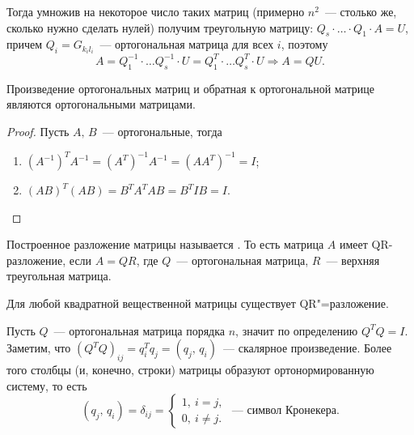 Тогда умножив на некоторое число таких матриц (примерно $n^2$~--- столько же, сколько нужно сделать нулей)
получим треугольную матрицу: $Q_s\cdot \ldots \cdot Q_1\cdot A = U$, причем $Q_i=G_{k_i l_{i}}$~--- 
ортогональная матрица для всех $i$, поэтому
\[
    A = Q_{1}^{-1}\cdot\ldots Q_{s}^{-1}\cdot U = Q_{1}^{T}\cdot\ldots Q_{s}^{T}\cdot U\Rightarrow A = QU.
\]

\begin{claim}
    Произведение ортогональных матриц и обратная к ортогональной матрице являются ортогональными матрицами.

    \begin{proof}
        Пусть $A,\, B$~--- ортогональные, тогда
        \begin{enumerate}
            \item $(A^{-1})^TA^{-1}=(A^T)^{-1}A^{-1}=(AA^T)^{-1}=I$;
            \item $(AB)^T(AB) = B^TA^TAB=B^TIB=I$.
        \end{enumerate}
    \end{proof}
\end{claim}

\begin{definition}
    Построенное разложение матрицы называется . То есть матрица $A$
    имеет QR-разложение, если $A=QR$, где $Q$~--- ортогональная матрица, $R$~--- верхняя треугольная матрица.
\end{definition}

\begin{theorem}
    Для любой квадратной вещественной матрицы существует QR"=разложение.
\end{theorem}

Пусть $Q$~--- ортогональная матрица порядка $n$, значит по определению $Q^TQ=I$. Заметим, что 
$(Q^TQ)_{ij}=q^T_{i}q_j=(q_j,\, q_i)$~--- скалярное произведение. Более того
столбцы (и, конечно, строки) матрицы образуют ортонормированную систему, то есть 
\[
    (q_j,\, q_i)=\delta_{ij}=\begin{cases}
        1,\ i=j,\\
        0,\ i\neq j.
    \end{cases}\text{~--- символ Кронекера.}
\]

